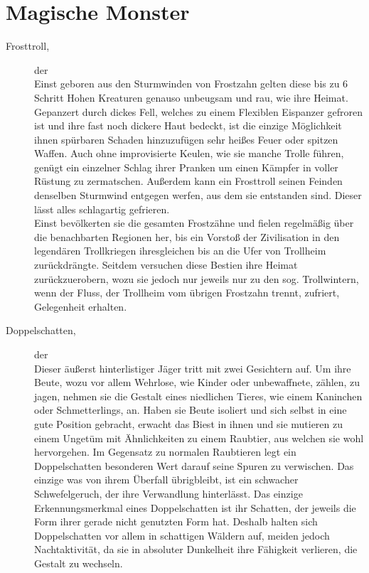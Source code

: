 \documentclass[a4paper,12pt,oneside]{book}
\begin{document}
\chapter{Magische Monster}

\begin{description}

\item[Frosttroll,]der
\\Einst geboren aus den Sturmwinden von Frostzahn gelten diese bis zu 6 Schritt Hohen Kreaturen genauso unbeugsam und rau, wie ihre Heimat. Gepanzert durch dickes Fell, welches zu einem Flexiblen Eispanzer gefroren ist und ihre fast noch dickere Haut bedeckt, ist die einzige Möglichkeit ihnen spürbaren Schaden hinzuzufügen sehr heißes Feuer oder spitzen Waffen. Auch ohne improvisierte Keulen, wie sie manche Trolle führen, genügt ein einzelner Schlag ihrer Pranken um einen Kämpfer in voller Rüstung zu zermatschen. Außerdem kann ein Frosttroll seinen Feinden denselben Sturmwind entgegen werfen, aus dem sie entstanden sind. Dieser lässt alles schlagartig gefrieren.
\\Einst bevölkerten sie die gesamten Frostzähne und fielen regelmäßig über die benachbarten Regionen her, bis ein Vorstoß der Zivilisation in den legendären Trollkriegen ihresgleichen bis an die Ufer von Trollheim zurückdrängte. Seitdem versuchen diese Bestien ihre Heimat zurückzuerobern, wozu sie jedoch nur jeweils nur zu den sog. Trollwintern, wenn der Fluss, der Trollheim vom übrigen Frostzahn trennt, zufriert, Gelegenheit erhalten.

\item[Doppelschatten,] der
\\Dieser äußerst hinterlistiger Jäger tritt mit zwei Gesichtern auf. Um ihre Beute, wozu vor allem Wehrlose, wie Kinder oder unbewaffnete, zählen, zu jagen, nehmen sie die Gestalt eines niedlichen Tieres, wie einem Kaninchen oder Schmetterlings, an. Haben sie Beute isoliert und sich selbst in eine gute Position gebracht, erwacht das Biest in ihnen und sie mutieren zu einem Ungetüm mit Ähnlichkeiten zu einem Raubtier, aus welchen sie wohl hervorgehen. Im Gegensatz zu normalen Raubtieren legt ein Doppelschatten besonderen Wert darauf seine Spuren zu verwischen. Das einzige was von ihrem Überfall übrigbleibt, ist ein schwacher Schwefelgeruch, der ihre Verwandlung hinterlässt. Das einzige Erkennungsmerkmal eines Doppelschatten ist ihr Schatten, der jeweils die Form ihrer gerade nicht genutzten Form hat. Deshalb halten sich Doppelschatten vor allem in schattigen Wäldern auf, meiden jedoch Nachtaktivität, da sie in absoluter Dunkelheit ihre Fähigkeit verlieren, die Gestalt zu wechseln.


\end{description}
\end{document}
